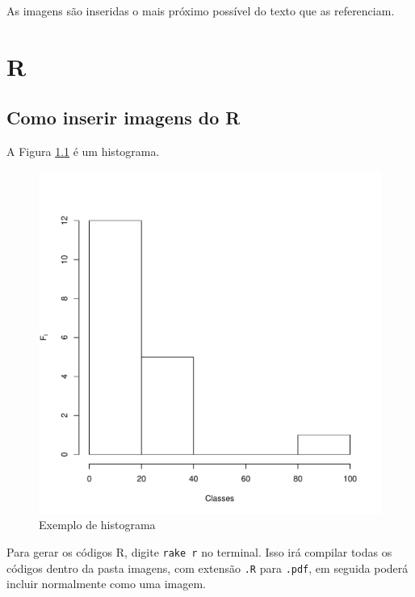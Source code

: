 \documentclass[
	12pt,				%
	oneside,			%
	a4paper,			%
	english,			%
	french,				%
	spanish,			%
	brazil				%
	]{abntex2}
\begin{document}
As imagens são inseridas o mais próximo possível do texto que as
referenciam.

\hypertarget{r}{%
\chapter{R}\label{r}}

\hypertarget{como-inserir-imagens-do-r}{%
\section{Como inserir imagens do R}\label{como-inserir-imagens-do-r}}

A Figura \ref{histograma} é um histograma.

\begin{figure}[htbp]
\hypertarget{histograma}{%
\caption{Exemplo de histograma}\label{histograma}
\begin{center}
\includegraphics[scale=0.4]{imagens/R/historgrama.pdf}
\end{center}
}
\end{figure}

Para gerar os códigos R, digite \texttt{rake\ r} no terminal. Isso irá
compilar todas os códigos dentro da pasta imagens, com extensão
\texttt{.R} para \texttt{.pdf}, em seguida poderá incluir normalmente
como uma imagem.
\end{document}
